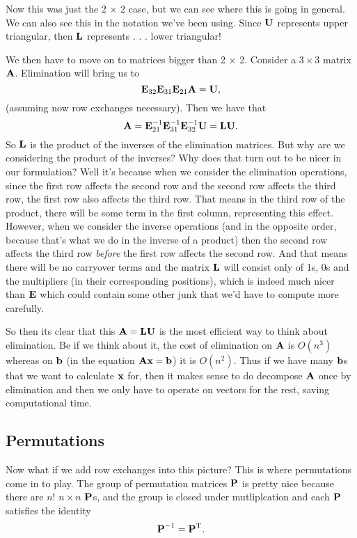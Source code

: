 Now this was just the 2 $\times$ 2 case, but we can see where this is going in general. We can also see this in the notation we've been using. Since $\boldsymbol{\mathbf{U}}$ represents upper triangular, then $\boldsymbol{\mathbf{L}}$ represents . . . lower triangular!

We then have to move on to matrices bigger than 2 $\times$ 2. 
\bex
Consider a $3\times 3$ matrix $\boldsymbol{\mathbf{A}}$. Elimination will bring us to
\[ \boldsymbol{\mathbf{E}}_{32}\boldsymbol{\mathbf{E}}_{31}\boldsymbol{\mathbf{E}}_{21}\boldsymbol{\mathbf{A}} = \boldsymbol{\mathbf{U}}, \]
(assuming now row exchanges necessary). Then we have that
\[ \boldsymbol{\mathbf{A}} = \boldsymbol{\mathbf{E}}_{21}^{-1}\boldsymbol{\mathbf{E}}_{31}^{-1}\boldsymbol{\mathbf{E}}_{32}^{-1}\boldsymbol{\mathbf{U}} = \boldsymbol{\mathbf{L}}\boldsymbol{\mathbf{U}}. \]
So $\boldsymbol{\mathbf{L}}$ is the product of the inverses of the elimination matrices. But why are we considering the product of the inverses? Why does that turn out to be nicer in our formulation? Well it's because when we consider the elimination operations, since the first row affects the second row and the second row affects the third row, the first row also affects the third row. That means in the third row of the product, there will be some term in the first column, representing this effect. However, when we consider the inverse operations (and in the opposite order, because that's what we do in the inverse of a product) then the second row affects the third row \textit{before} the first row affects the second row. And that means there will be no carryover terms and the matrix $\boldsymbol{\mathbf{L}}$ will consist only of 1s, 0s and the multipliers (in their corresponding positions), which is indeed much nicer than $\boldsymbol{\mathbf{E}}$ which could contain some other junk that we'd have to compute more carefully.
\eex

So then its clear that this $\boldsymbol{\mathbf{A}} = \boldsymbol{\mathbf{L}}\boldsymbol{\mathbf{U}}$ is the most efficient way to think about elimination. Be if we think about it, the cost of elimination on $\boldsymbol{\mathbf{A}}$ is $O(n^3)$ whereas on $\boldsymbol{\mathbf{b}}$ (in the equation $\boldsymbol{\mathbf{A}}\boldsymbol{\mathbf{x}} = \boldsymbol{\mathbf{b}}$) it is $O(n^2)$. Thus if we have many $\boldsymbol{\mathbf{b}}$s that we want to calculate $\boldsymbol{\mathbf{x}}$ for, then it makes sense to do decompose $\boldsymbol{\mathbf{A}}$ once by elimination and then we only have to operate on vectors for the rest, saving computational time. 

\subsection{Permutations}

Now what if we add row exchanges into this picture? This is where permutations come in to play. The group of permutation matrices $\boldsymbol{\mathbf{P}}$ is pretty nice because there are $n!$ $n \times n$ $\boldsymbol{\mathbf{P}}$s, and the group is closed under mutliplcation and each $\boldsymbol{\mathbf{P}}$ satisfies the identity 
\[ \boldsymbol{\mathbf{P}}^{-1} = \boldsymbol{\mathbf{P}}^\mathrm{T}. \]



